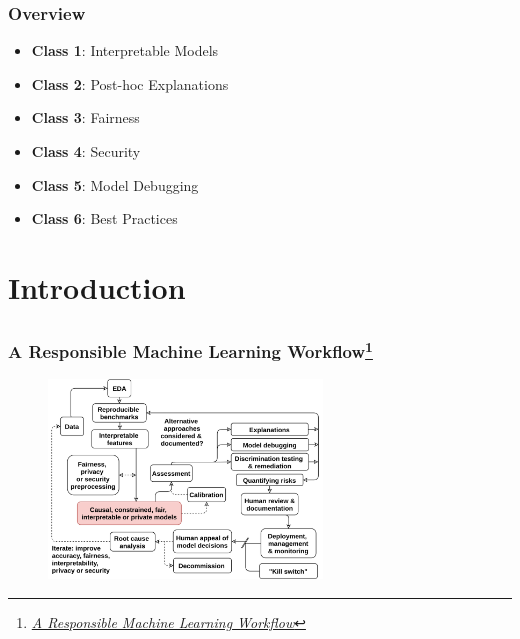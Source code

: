 \documentclass[11pt,aspectratio=169,hyperref={colorlinks}]{beamer}
\begin{document}
	
	\begin{frame}
	
		\frametitle{Overview}
		
		\begin{itemize}
			\item{\textbf{Class 1}: Interpretable Models}
			\item{\textbf{Class 2}: Post-hoc Explanations}
			\item{\textbf{Class 3}: Fairness}
			\item{\textbf{Class 4}: Security}
			\item{\textbf{Class 5}: Model Debugging}
			\item{\textbf{Class 6}: Best Practices}
		\end{itemize}
			
					
	\end{frame}

	\section{Introduction}
	
		\subsection*{}
			
		\begin{frame}
		
			\frametitle{A Responsible Machine Learning Workflow\footnote{\href{https://www.mdpi.com/2078-2489/11/3/137/htm}{\textit{A Responsible Machine Learning Workflow}}}}
			
			\begin{figure}[htb]
				\begin{center}
					\includegraphics[height=150pt]{../img/rml_diagram_lec1_hilite.png}
					\label{fig:blueprint}
				\end{center}
			\end{figure}		
					
		\end{frame}					
\end{document}
